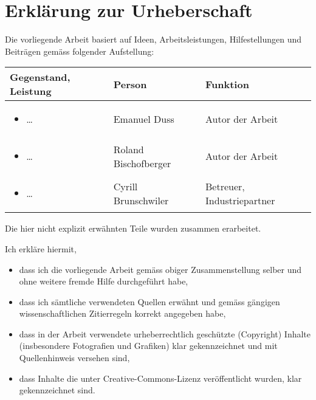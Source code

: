 \chapter{Erklärung zur Urheberschaft}

Die vorliegende Arbeit basiert auf Ideen, Arbeitsleistungen, Hilfestellungen
und Beiträgen gemäss folgender Aufstellung:

\begin{tabular}[l]{| p{8cm} | l | l |}
\hline
\textbf{Gegenstand, Leistung} & \textbf{Person} & \textbf{Funktion} \\ \hline \hline
\begin{itemize}
  \item \ldots
\end{itemize}
  & Emanuel Duss
  & Autor der Arbeit \\ \hline
\begin{itemize}
  \item \ldots
\end{itemize}
  & Roland Bischofberger
  & Autor der Arbeit \\ \hline
\begin{itemize}
  \item \ldots
\end{itemize}
  & Cyrill Brunschwiler
  & Betreuer, Industriepartner \\ \hline
\end{tabular}

Die hier nicht explizit erwähnten Teile wurden zusammen erarbeitet.

Ich erkläre hiermit,

\begin{itemize}
  \item dass ich die vorliegende Arbeit gemäss obiger Zusammenstellung selber
    und ohne weitere fremde Hilfe durchgeführt habe,
  \item dass ich sämtliche verwendeten Quellen erwähnt und gemäss gängigen
    wissenschaftlichen Zitierregeln korrekt angegeben habe,
  \item dass in der Arbeit verwendete urheberrechtlich geschützte (Copyright)
    Inhalte (insbesondere Fotografien und Grafiken) klar gekennzeichnet und mit
    Quellenhinweis versehen sind,
  \item dass Inhalte die unter Creative-Commons-Lizenz veröffentlicht wurden,
    klar gekennzeichnet sind.
\end{itemize} 

